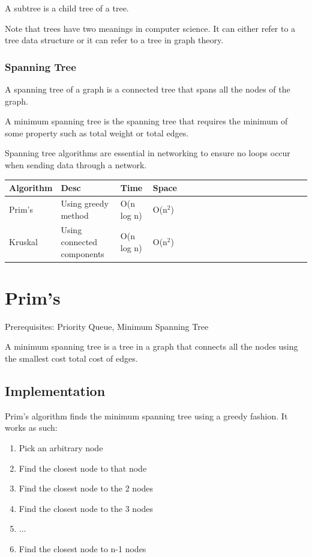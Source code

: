 \documentclass[11pt,oneside]{book}
\begin{document}
A subtree is a child tree of a tree.

Note that trees have two meanings in computer science. It can either refer to a tree data structure or it can refer to a tree in graph theory.


\subsubsection{Spanning Tree}



A spanning tree of a graph is a connected tree that spans all the nodes of the graph.

A minimum spanning tree is the spanning tree that requires the minimum of some property such as total weight or total edges.

Spanning tree algorithms are essential in networking to ensure no loops occur when sending data through a network.

\vspace{10px}\begin{tabulary}{0.4\linewidth}{|l|l|l|l|l|l|l|l|l|l|l|l|l|l|l|l|l|l|l}\hline


  Algorithm &
  Desc &
  Time &
  Space\\
\hline


  Prim's &
  Using greedy method &
  O(n log n) &
  O(n$^{2}$)\\

  Kruskal &
  Using connected components &
  O(n log n) &
  O(n$^{2}$)\\

\hline\end{tabulary}



        \section{ Prim's }
        Prerequisites:  Priority Queue, Minimum Spanning Tree

A minimum spanning tree is a tree in a graph that connects all the nodes using the smallest cost total cost of edges.

\subsection{Implementation}

Prim's algorithm finds the minimum spanning tree using a greedy fashion. It works as such:

\begin{enumerate}
\item Pick an arbitrary node
\item Find the closest node to that node
\item Find the closest node to the 2 nodes
\item Find the closest node to the 3 nodes
\item ...
\item Find the closest node to n-1 nodes
\end{enumerate}
\end{document}
